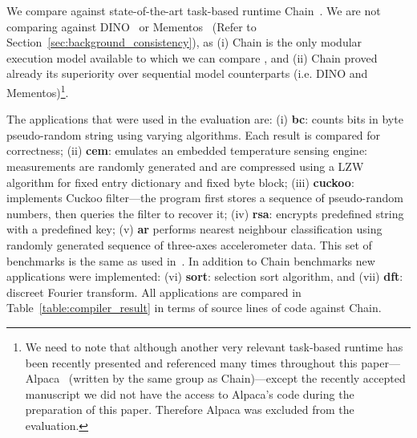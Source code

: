 We compare \sys against state-of-the-art task-based runtime Chain~\cite{chain}. We are not comparing \sys against DINO~\cite{dino} or Mementos~\cite{mementos} (Refer to Section~\ref{sec:background_consistency}), as (i) Chain is the only modular execution model available to which we can compare \sys, and (ii) Chain proved already its superiority over sequential model counterparts (i.e. DINO and Mementos)\footnote{We need to note that although another very relevant task-based runtime has been recently presented and referenced many times throughout this paper---Alpaca~\cite{alpaca} (written by the same group as Chain)---except the recently accepted manuscript we did not have the access to Alpaca's code during the preparation of this paper. Therefore Alpaca was excluded from the evaluation.}.

The applications that were used in the evaluation are: (i) \textbf{bc}: counts bits in byte pseudo-random string using varying algorithms. Each result is compared for correctness; (ii) \textbf{cem}: emulates an embedded temperature sensing engine: measurements are randomly generated and are compressed using a LZW algorithm for  fixed entry dictionary and fixed byte block; (iii) \textbf{cuckoo}: implements Cuckoo filter---the program first stores a sequence of pseudo-random numbers, then queries the filter to recover it; (iv) \textbf{rsa}: encrypts predefined string with a predefined key; (v) \textbf{ar} performs nearest neighbour classification using randomly generated sequence of three-axes accelerometer data. This set of benchmarks is the same as used in~\cite{chain,alpaca}. In addition to Chain benchmarks new applications were implemented: (vi) \textbf{sort}: selection sort algorithm, and (vii) \textbf{dft}: discreet Fourier transform. All applications are compared in Table~\ref{table:compiler_result} in terms of source lines of code against Chain.



